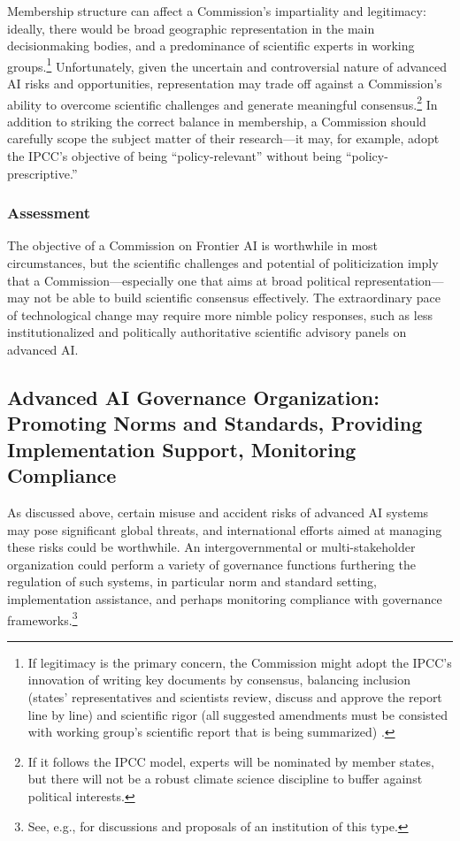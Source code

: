 \documentclass[12pt]{article}
\begin{document}
Membership structure can affect a Commission's impartiality and
legitimacy: ideally, there would be broad geographic representation in
the main decisionmaking bodies, and a predominance of scientific experts
in working groups.\footnote{If legitimacy is the primary concern, the
Commission might adopt the IPCC's innovation of writing key documents
by consensus, balancing inclusion (states' representatives and
scientists review, discuss and approve the report line by line) and
scientific rigor (all suggested amendments must be consisted with
working group's scientific report that is being summarized) \cite{shaw_relevant_2004}.}
Unfortunately, given the uncertain and controversial nature of advanced
AI risks and opportunities, representation may trade off against a
Commission's ability to overcome scientific challenges and generate
meaningful consensus.\footnote{If it follows the IPCC model, experts
will be nominated by member states, but there will not be a robust
climate science discipline to buffer against political interests.} In
addition to striking the correct balance in membership, a Commission
should carefully scope the subject matter of their research---it may,
for example, adopt the IPCC's objective of being ``policy-relevant''
without being ``policy-prescriptive.''


\subsubsection*{Assessment}

The objective of a Commission on Frontier AI is worthwhile in most
circumstances, but the scientific challenges and potential of
politicization imply that a Commission---especially one that aims at
broad political representation---may not be able to build scientific
consensus effectively. The extraordinary pace of technological change
may require more nimble policy responses, such as less institutionalized
and politically authoritative scientific advisory panels on advanced AI.


\subsection{Advanced AI Governance Organization: Promoting Norms and
Standards, Providing Implementation Support, Monitoring
Compliance}

As discussed above, certain misuse and accident risks of advanced AI
systems may pose significant global threats, and international efforts
aimed at managing these risks could be worthwhile. An intergovernmental
or multi-stakeholder organization could perform a variety of governance
functions furthering the regulation of such systems, in particular norm
and standard setting, implementation assistance, and perhaps monitoring
compliance with governance frameworks.\footnote{See, e.g.,
\cite{noauthor_secretary-general_2023, noauthor_elders_2023,
altman_governance_2023, chowdhury_ai_2023, marcus_world_2023} for discussions and
proposals of an institution of this type.}
\end{document}
